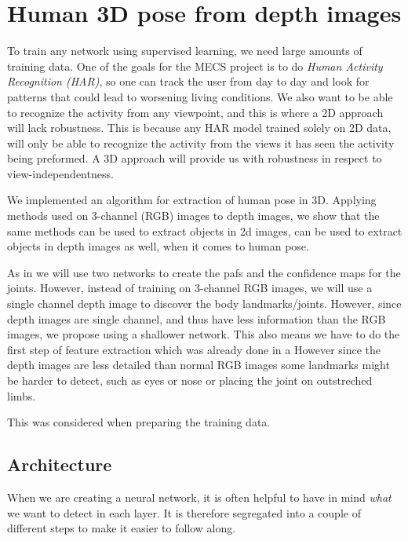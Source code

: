 \chapter{Human 3D pose from depth images}

To train any network using supervised learning, we need large amounts of training data. One of the goals for the MECS project is to do \emph{Human Activity Recognition (HAR)}, so one can track the user from day to day and look for patterns that could lead to worsening living conditions. We also want to be able to recognize the activity from any viewpoint, and this is where a 2D approach will lack robustness. This is because any HAR model trained solely on 2D data, will only be able to recognize the activity from the views it has seen the activity being preformed. A 3D approach will provide us with robustness in respect to view-independentness.

We implemented an algorithm for extraction of human pose in 3D.
Applying methods used on 3-channel (RGB) images to depth images, we show that the same methods can be used to extract objects in 2d images, can be used to extract objects in depth images as well, when it comes to human pose.

As in \cite{cao2017realtime} we will use two networks to create the \gls{paf}s and the confidence maps for the joints. However, instead of training on 3-channel RGB images, we will use a single channel depth image to discover the body landmarks/joints.
However, since depth images are single channel, and thus have less information than the RGB images, we propose using a shallower network. This also means we have to do the first step of feature extraction which was already done in a
However since the depth images are less detailed than normal RGB images some landmarks might be harder to detect, such as eyes or nose or placing the joint on outstreched limbs.


This was considered when preparing the training data.

\section{Architecture}

When we are creating a neural network, it is often helpful to have in mind \emph{what} we want to detect in each layer. It is therefore segregated into a couple of different steps to make it easier to follow along.

